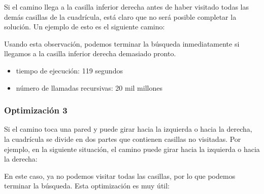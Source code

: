 Si el camino llega a la casilla inferior derecha
antes de haber visitado todas las demás casillas de la cuadrícula,
está claro que
no será posible completar la solución.
Un ejemplo de esto es el siguiente camino:

\begin{center}
\end{center}
Usando esta observación, podemos terminar la búsqueda
inmediatamente si llegamos a la casilla inferior derecha demasiado pronto.

\begin{itemize}[itemsep=0em,topsep=0.5em]
    \item tiempo de ejecución: 119 segundos
    \item número de llamadas recursivas: 20 mil millones
\end{itemize}

\subsubsection{Optimización 3}

Si el camino toca una pared
y puede girar hacia la izquierda o hacia la derecha,
la cuadrícula se divide en dos partes
que contienen casillas no visitadas.
Por ejemplo, en la siguiente situación,
el camino puede girar hacia la izquierda o hacia la derecha:

\begin{center}
\end{center}
En este caso, ya no podemos visitar todas las casillas,
por lo que podemos terminar la búsqueda.
Esta optimización es muy útil:

